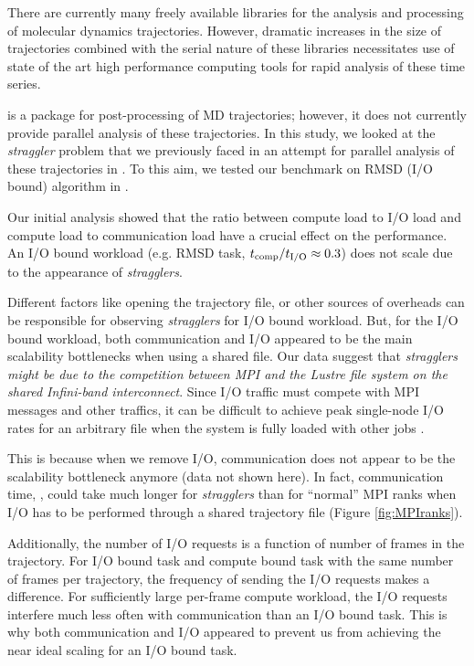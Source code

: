 \label{concl} 
There are currently many freely available libraries for the analysis and processing of molecular dynamics trajectories.
However, dramatic increases in the size of trajectories combined with the serial nature of these libraries necessitates 
use of state of the art high performance computing tools for rapid analysis of these time series. 

 is a package for post-processing of MD trajectories; however, it does not currently provide parallel analysis of these trajectories.
In this study, we looked at the \emph{straggler} problem that we previously faced in an attempt for parallel analysis of these trajectories in  \cite{Khoshlessan:2017ab}.
To this aim, we tested our benchmark on RMSD (I/O bound) algorithm in .

Our initial analysis showed that the ratio between compute load to I/O load and compute load to communication load have a crucial effect on the performance. 
An I/O bound workload (e.g. RMSD task, ${t}_{\text{comp}}/{t}_{\text{I/O}} \approx 0.3$) does not scale due to the appearance of \emph{stragglers}. 

Different factors like opening the trajectory file, or other sources of overheads can be responsible for observing \emph{stragglers} for I/O bound workload.
But, for the I/O bound workload, both communication and I/O appeared to be the main scalability bottlenecks when using a shared file.
Our data suggest that \emph{stragglers might be due to the competition between MPI and the Lustre file system on the shared Infini-band interconnect}.  
Since I/O traffic must compete with MPI messages and other traffics, it can be difficult to achieve peak single-node I/O rates for an arbitrary file when the system is fully loaded with other jobs \cite{VMD2013, Kevin2018}. 

This is because when we remove I/O, communication does not appear to be the scalability bottleneck anymore (data not shown here).
In fact, communication time, \tcomm, could take
much longer for \emph{stragglers} than for ``normal'' MPI ranks when I/O has to be performed through a shared trajectory file (Figure \ref{fig:MPIranks}). 

Additionally, the number of I/O requests is a function of number of frames in the trajectory. 
For I/O bound task and compute bound task with the same number of frames per trajectory, the frequency of sending the I/O requests makes a difference.
For sufficiently large per-frame compute workload, the I/O requests interfere much less often with communication than an I/O bound task.
This is why both communication and I/O appeared to prevent us from achieving the near ideal scaling for an I/O bound task.

